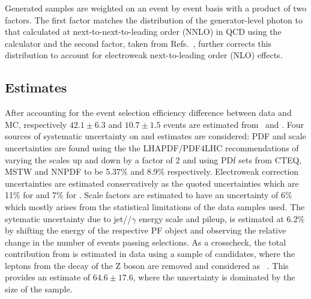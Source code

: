Generated samples are weighted on an event by event basis with a product of two factors. 
The first factor matches the distribution of the generator-level photon
 \pt to that calculated at next-to-next-to-leading order (NNLO) in QCD using the 
 \DYRes~\cite{Catani:2015vma} calculator and
 the second factor, taken from
 Refs.~\cite{Denner:2014bna,Denner:2015fca}, further corrects this distribution
 to account for electroweak next-to-leading order (NLO) effects. 


 \subsection{\vg Estimates}
After accounting for the event selection efficiency difference between data and MC,
 respectively $42.1 \pm 6.3$ and $10.7 \pm 1.5$ events are estimated
 from \zgnng\ and \wglng. 
Four sources of systematic uncertainty on \zg and \wg estimates are considered:
PDF and scale uncertainties are
 found using the the LHAPDF/PDF4LHC recommendations
 of varying the scales up and down by a factor of 2 
 and using PDf sets from CTEQ, MSTW and NNPDF 
 to be 5.37\% and 8.9\% respectively.
Electroweak correction uncertainties
 are estimated conservatively as the quoted uncertainties
 which are 11\% for \zg and 7\% for \wg.
Scale factors are estimated to have an uncertainty of 6\%
 which mostly  arises from the statistical limitations of the data samples
 used.
The sytematic uncertainty due to jet/\met/$\gamma$
 energy scale and pileup, is estimated at 6.2\%
 by shifting the energy of the respective PF object
 and observing the relative change in the number
 of events passing selections.  
As a crosscheck, the total contribution from \zgnng is estimated
 in data using a sample of \zgllg candidates,
 where the leptons from the decay of the Z boson are removed and considered as
 \met~\cite{monojet2014}. 
This provides an estimate of $64.6 \pm 17.6$, 
 where the uncertainty is dominated by the size of the sample.

